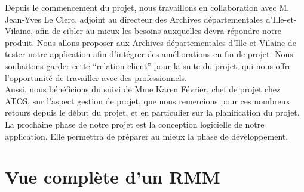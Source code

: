 \documentclass[a4paper]{article}
\begin{document}
	Depuis le commencement du projet, nous travaillons en collaboration avec M. Jean-Yves Le Clerc, adjoint au directeur des Archives départementales d’Ille-et-Vilaine, afin de cibler au mieux les besoins auxquelles devra répondre notre produit. Nous allons proposer aux Archives départementales d’Ille-et-Vilaine de tester notre application afin d'intégrer des améliorations en fin de projet. Nous souhaitons garder cette "`relation client"'  pour la suite du projet, qui nous offre l’opportunité de travailler avec des professionnels.\\
	
	Aussi, nous bénéficions du suivi de Mme Karen Février, chef de projet chez ATOS, sur l’aspect gestion de projet, que nous remercions pour ces nombreux retours depuis le début du projet, et en particulier sur la planification du projet.\\
	
	La prochaine phase de notre projet est la conception logicielle de notre application. Elle permettra de préparer au mieux la phase de développement.

\appendix

\section{Vue compl\`ete d'un RMM}
\label{sec:annexe 1}
\end{document}
